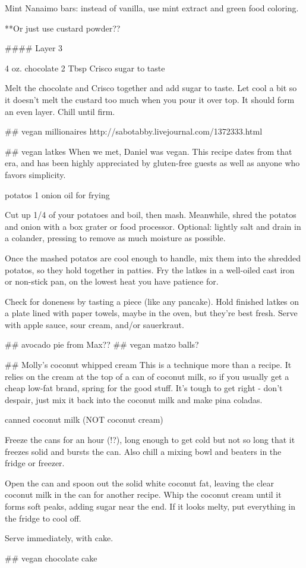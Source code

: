 Mint Nanaimo bars: instead of vanilla, use mint extract and green food coloring.

**Or just use custard powder??

#### Layer 3

4 oz. chocolate
2 Tbsp Crisco
sugar to taste

Melt the chocolate and Crisco together and add sugar to taste. Let cool a bit so it doesn't melt the custard too much when you pour it over top. It should form an even layer. Chill until firm.

## vegan millionaires
http://sabotabby.livejournal.com/1372333.html

## vegan latkes
When we met, Daniel was vegan. This recipe dates from that era, and has been highly appreciated by gluten-free guests as well as anyone who favors simplicity.

potatos
1 onion
oil for frying

Cut up 1/4 of your potatoes and boil, then mash. Meanwhile, shred the potatos and onion with a box grater or food processor. Optional: lightly salt and drain in a colander, pressing to remove as much moisture as possible.

Once the mashed potatos are cool enough to handle, mix them into the shredded potatos, so they hold together in patties. Fry the latkes in a well-oiled cast iron or non-stick pan, on the lowest heat you have patience for.

Check for doneness by tasting a piece (like any pancake). Hold finished latkes on a plate lined with paper towels, maybe in the oven, but they're best fresh. Serve with apple sauce, sour cream, and/or sauerkraut.

## avocado pie from Max??
## vegan matzo balls?

## Molly's coconut whipped cream
This is a technique more than a recipe. It relies on the cream at the top of a can of coconut milk, so if you usually get a cheap low-fat brand, spring for the good stuff. It's tough to get right - don't despair, just mix it back into the coconut milk and make pina coladas.

canned coconut milk (NOT coconut cream)

Freeze the cans for an hour (!?), long enough to get cold but not so long that it freezes solid and bursts the can. Also chill a mixing bowl and beaters in the fridge or freezer.

Open the can and spoon out the solid white coconut fat, leaving the clear coconut milk in the can for another recipe. Whip the coconut cream until it forms soft peaks, adding sugar near the end. If it looks melty, put everything in the fridge to cool off.

Serve immediately, with cake.

## vegan chocolate cake

